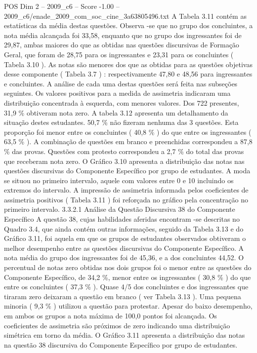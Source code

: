 \begin{textsample}{POS Dim 2 – 2009\_c6 – Score -1.00 – 2009\_c6/enade\_2009\_com\_soc\_cine\_3a63805496.txt}
A Tabela 3.11 contém as estatísticas da média destas questões.
Observa -se que no grupo dos concluintes, a nota média alcançada foi 33,58, enquanto que no grupo dos ingressantes foi de 29,87, ambas maiores do que as obtidas nas questões discursivas de Formação Geral, que foram de 28,75 para os ingressantes e 23,31 para os concluintes ( Tabela 3.10 ).
As notas são menores dos que as obtidas para as questões objetivas desse componente ( Tabela 3.7 ) : respectivamente 47,80 e 48,56 para ingressantes e concluintes.
A análise de cada uma destas questões será feita nas subseções seguintes.
Os valores positivos para a medida de assimetria indicaram uma distribuição concentrada à esquerda, com menores valores.
Dos 722 presentes, 31,9 \% obtiveram nota zero.
A tabela 3.12 apresenta um detalhamento da situação destes estudantes. 50,7 \% não fizeram nenhuma das 3 questões.
Esta proporção foi menor entre os concluintes ( 40,8 \% ) do que entre os ingressantes ( 63,5 \% ).
A combinação de questões em branco e preenchidas correspondeu a 87,8 \% das provas.
Questões com protesto correspondeu a 2,7 \% do total das provas que receberam nota zero.
O Gráfico 3.10 apresenta a distribuição das notas nas questões discursivas do Componente Específico por grupo de estudantes.
A moda se situou no primeiro intervalo, aquele com valores entre 0 e 10 incluindo os extremos do intervalo.
A impressão de assimetria informada pelos coeficientes de assimetria positivos ( Tabela 3.11 ) foi reforçada no gráfico pela concentração no primeiro intervalo. 3.3.2.1 Análise da Questão Discursiva 38 do Componente Específico A questão 38, cujas habilidades aferidas encontram -se descritas no Quadro 3.4, que ainda contém outras informações, seguido da Tabela 3.13 e do Gráfico 3.11, foi aquela em que os grupos de estudantes observados obtiveram o melhor desempenho entre as questões discursivas do Componente Específico.
A nota média do grupo dos ingressantes foi de 45,36, e a dos concluintes 44,52.
O percentual de notas zero obtidas nos dois grupos foi o menor entre as questões do Componente Específico, de 34,2 \%, menor entre os ingressantes ( 30,8 \% ) do que entre os concluintes ( 37,3 \% ).
Quase 4/5 dos concluintes e dos ingressantes que tiraram zero deixaram a questão em branco ( ver Tabela 3.13 ).
Uma pequena minoria ( 9,3 \% ) utilizou a questão para protestar.
Apesar do baixo desempenho, em ambos os grupos a nota máxima de 100,0 pontos foi alcançada.
Os coeficientes de assimetria são próximos de zero indicando uma distribuição simétrica em torno da média.
O Gráfico 3.11 apresenta a distribuição das notas na questão 38 discursiva do Componente Específico por grupo de estudantes.

\end{textsample}
